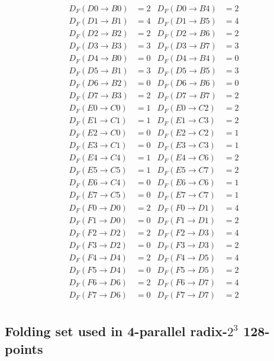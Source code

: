 \documentclass[a4paper, 10pt, conference]{ieeeconf}
\begin{document}
\begin{small}
\begin{align*}
D_F(D0\to B0)&=2 &  D_F(D0\to B4)&=2\\
D_F(D1\to B1)&=4 &  D_F(D1\to B5)&=4\\
D_F(D2\to B2)&=2 &  D_F(D2\to B6)&=2\\
D_F(D3\to B3)&=3 &  D_F(D3\to B7)&=3\\
D_F(D4\to B0)&=0 &  D_F(D4\to B4)&=0\\
D_F(D5\to B1)&=3 &  D_F(D5\to B5)&=3\\
D_F(D6\to B2)&=0 &  D_F(D6\to B6)&=0\\
D_F(D7\to B3)&=2 &  D_F(D7\to B7)&=2\\
D_F(E0\to C0)&=1 &  D_F(E0\to C2)&=2\\
D_F(E1\to C1)&=1 &  D_F(E1\to C3)&=2\\
D_F(E2\to C0)&=0 &  D_F(E2\to C2)&=1\\
D_F(E3\to C1)&=0 &  D_F(E3\to C3)&=1\\
D_F(E4\to C4)&=1 &  D_F(E4\to C6)&=2\\
D_F(E5\to C5)&=1 &  D_F(E5\to C7)&=2\\
D_F(E6\to C4)&=0 &  D_F(E6\to C6)&=1\\
D_F(E7\to C5)&=0 &  D_F(E7\to C7)&=1\\
D_F(F0\to D0)&=2 &  D_F(F0\to D1)&=4\\
D_F(F1\to D0)&=0 &  D_F(F1\to D1)&=2\\
D_F(F2\to D2)&=2 &  D_F(F2\to D3)&=4\\
D_F(F3\to D2)&=0 &  D_F(F3\to D3)&=2\\
D_F(F4\to D4)&=2 &  D_F(F4\to D5)&=4\\
D_F(F5\to D4)&=0 &  D_F(F5\to D5)&=2\\
D_F(F6\to D6)&=2 &  D_F(F6\to D7)&=4\\
D_F(F7\to D6)&=0 &  D_F(F7\to D7)&=2\\
\end{align*}
\end{small}

\subsection{Folding set used in 4-parallel  radix-$2^3$ 128-points\label{sec:appen:folding_set_128}}
\end{document}
